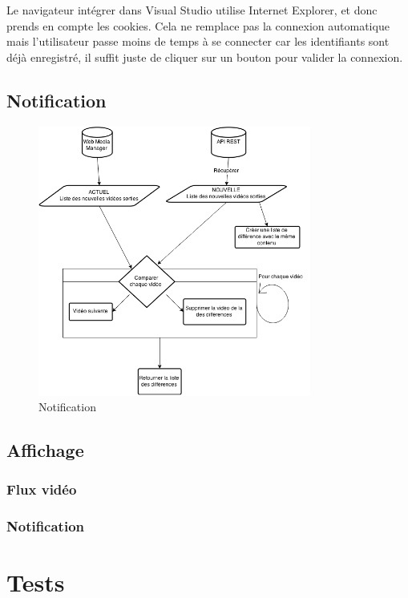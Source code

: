 \documentclass[11pt]{report} %
\begin{document}
	Le navigateur intégrer dans Visual Studio utilise Internet Explorer, et donc prends en compte les cookies. Cela ne remplace pas la connexion automatique mais l'utilisateur passe moins de temps à se connecter car les identifiants sont déjà enregistré, il suffit juste de cliquer sur un bouton pour valider la connexion.
	
	\section{Notification}
	
	\begin{figure}[h]
		\center
		\includegraphics[width=0.8\textwidth]{../img/notification.png}
		\caption{Notification}
		\label{checkNotif}
	\end{figure}
	
	\section{Affichage}
		\subsection{Flux vidéo}
		
		\subsection{Notification}
		
	
\chapter{Tests}
\end{document}
